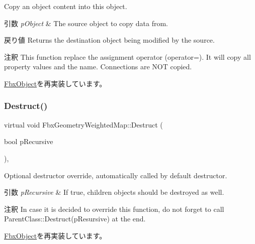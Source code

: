 Copy an object content into this object. 
\begin{DoxyParams}{引数}
{\em p\+Object} & The source object to copy data from. \\
\hline
\end{DoxyParams}
\begin{DoxyReturn}{戻り値}
Returns the destination object being modified by the source. 
\end{DoxyReturn}
\begin{DoxyRemark}{注釈}
This function replace the assignment operator (operator=). It will copy all property values and the name. Connections are N\+OT copied. 
\end{DoxyRemark}


\hyperlink{class_fbx_object_a0c0c5adb38284d14bb82c04d54504a3e}{Fbx\+Object}を再実装しています。

\mbox{\label{class_fbx_geometry_weighted_map_a638d84bf777db4a17d63505f62d9f22f}} 
\subsubsection{\texorpdfstring{Destruct()}{Destruct()}}
{\footnotesize\ttfamily virtual void Fbx\+Geometry\+Weighted\+Map\+::\+Destruct (\begin{DoxyParamCaption}\item[{bool}]{p\+Recursive }\end{DoxyParamCaption})\hspace{0.3cm}{\ttfamily [protected]}, {\ttfamily [virtual]}}

Optional destructor override, automatically called by default destructor. 
\begin{DoxyParams}{引数}
{\em p\+Recursive} & If true, children objects should be destroyed as well. \\
\hline
\end{DoxyParams}
\begin{DoxyRemark}{注釈}
In case it is decided to override this function, do not forget to call Parent\+Class\+::\+Destruct(p\+Resursive) at the end. 
\end{DoxyRemark}


\hyperlink{class_fbx_object_a123e084d9b32b29c28af6384b7c3c608}{Fbx\+Object}を再実装しています。

